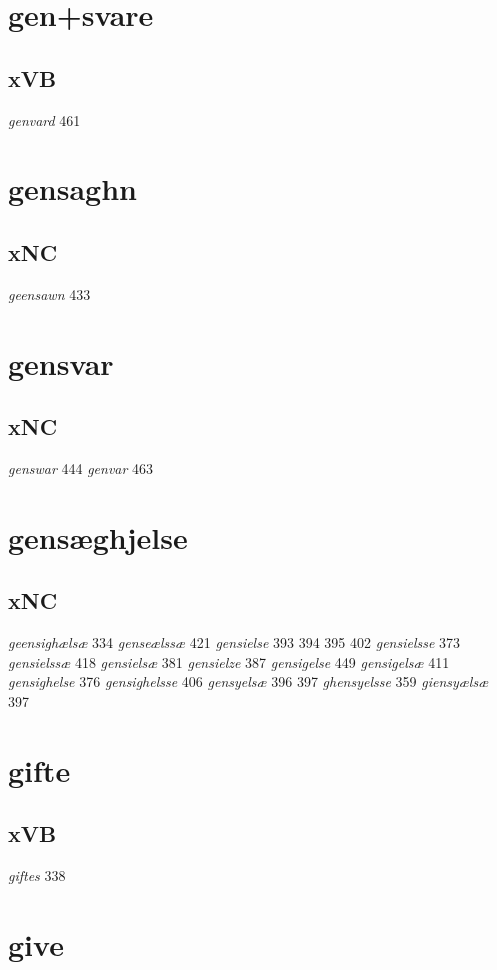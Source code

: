 \documentclass[a4paper,twocolumn]{article}
\begin{document}
\section{gen+svare}
\label{sec:orgd85e3a0}
\subsection{xVB}
\label{sec:org8a01738}
\emph{genvard} 461 
\section{gensaghn}
\label{sec:orged60172}
\subsection{xNC}
\label{sec:orgf0ad3a8}
\emph{geensawn} 433 
\section{gensvar}
\label{sec:org12b51ab}
\subsection{xNC}
\label{sec:orgb1676ca}
\emph{genswar} 444 \emph{genvar} 463 
\section{gensæghjelse}
\label{sec:orgd587c00}
\subsection{xNC}
\label{sec:orgc57a0e3}
\emph{geensighælsæ} 334 \emph{genseælssæ} 421 \emph{gensielse} 393 394 395 402 \emph{gensielsse} 373 \emph{gensielssæ} 418 \emph{gensielsæ} 381 \emph{gensielze} 387 \emph{gensigelse} 449 \emph{gensigelsæ} 411 \emph{gensighelse} 376 \emph{gensighelsse} 406 \emph{gensyelsæ} 396 397 \emph{ghensyelsse} 359 \emph{giensyælsæ} 397 
\section{gifte}
\label{sec:org628afc0}
\subsection{xVB}
\label{sec:org2a21064}
\emph{giftes} 338 
\section{give}
\label{sec:org9358979}
\end{document}
